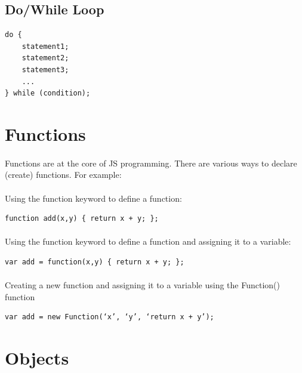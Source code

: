 \subsection{Do/While Loop}
\begin{lstlisting}
do {
  	statement1;
  	statement2;
  	statement3;
  	...
} while (condition);
\end{lstlisting}


\section{Functions}
\paragraph{} Functions are at the core of JS programming. There are various ways to declare (create) functions. For example:

\paragraph{} Using the function keyword to define a function:

\begin{lstlisting}
function add(x,y) { return x + y; };
\end{lstlisting}

\paragraph{} Using the function keyword to define a function and assigning it to a variable:

\begin{lstlisting}
var add = function(x,y) { return x + y; };
\end{lstlisting}

\paragraph{} Creating a new function and assigning it to a variable using the Function() function

\begin{lstlisting}
var add = new Function(‘x’, ‘y’, ‘return x + y’);
\end{lstlisting}



\section{Objects}
